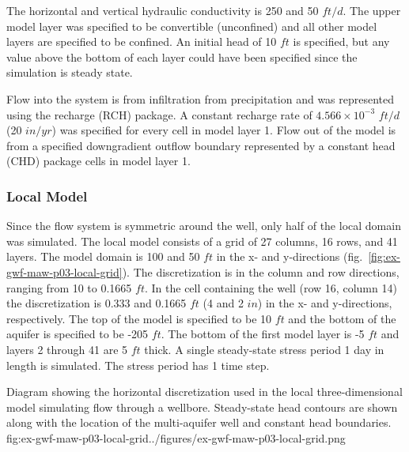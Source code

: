 The horizontal and vertical hydraulic conductivity is 250 and 50 $ft/d$. The upper model layer was specified to be convertible (unconfined) and all other model layers are specified to be confined. An initial head of 10 $ft$ is specified, but any value above the bottom of each layer could have been specified since the simulation is steady state. 

Flow into the system is from infiltration from precipitation and was represented using the recharge (RCH) package. A constant recharge rate of $4.566 \times 10^{-3}$ $ft/d$ (20 $in/yr$) was specified for every cell in model layer 1. Flow out of the model is from a specified downgradient outflow boundary represented by a constant head (CHD) package cells in model layer 1.

\subsubsection{Local Model}

Since the flow system is symmetric around the well, only half of the local domain was simulated. The local model consists of a grid of 27 columns, 16 rows, and 41 layers. The model domain is 100 and 50 $ft$ in the x- and y-directions (fig.~\ref{fig:ex-gwf-maw-p03-local-grid}). The discretization is in the column and row directions, ranging from 10 to 0.1665 $ft$. In the cell containing the well (row 16, column 14) the discretization is 0.333 and 0.1665 $ft$ (4 and 2 $in$) in the x- and y-directions, respectively. The top of the model is specified to be 10 $ft$ and the bottom of the aquifer is specified to be -205 $ft$. The bottom of the first model layer is -5 $ft$ and layers 2 through 41 are 5 $ft$ thick. A single steady-state stress period 1 day in length is simulated. The stress period has 1 time step.


\begin{StandardFigure}{
                                     Diagram showing the horizontal discretization used in the local three-dimensional
                                     model simulating flow through a wellbore. Steady-state head contours are shown
                                     along with the location of the multi-aquifer well and constant head boundaries. 
                                     }{fig:ex-gwf-maw-p03-local-grid}{../figures/ex-gwf-maw-p03-local-grid.png}
\end{StandardFigure}   


